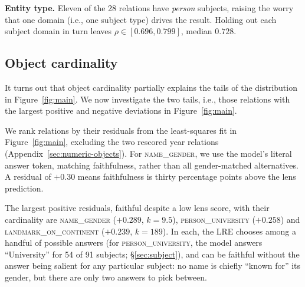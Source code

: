 \documentclass{article}
\begin{document}

\textbf{Entity type.} Eleven of the 28 relations have
\textit{person} subjects, raising the worry that one domain
(i.e., one subject type)
drives the
result. Holding out each subject domain in turn leaves
$\rho \in [0.696, 0.799]$, median $0.728$.

\subsection{Object cardinality}
\label{sec:residuals}
It turns out that object cardinality partially explains the
tails of the distribution 
in Figure~\ref{fig:main}.
We now investigate  the two tails, i.e., those relations
with the largest positive and negative deviations
in Figure~\ref{fig:main}.

We rank relations by their residuals from the least-squares fit in
Figure~\ref{fig:main}, excluding the two rescored year relations
(Appendix~\ref{sec:numeric-objects}). For \textsc{name\_gender}, we use
the model's literal answer token, matching faithfulness, rather than all
gender-matched alternatives. A residual of $+0.30$ means faithfulness
is thirty percentage points above the lens prediction.


The largest positive residuals, faithful despite a low
lens score, with their cardinality are
\textsc{name\_gender} ($+0.289$, $k = 9.5$),
\textsc{person\_university} ($+0.258$) and
\textsc{landmark\_on\_continent} ($+0.239$, $k = 189$). In each, the LRE
chooses among a handful of possible answers (for \textsc{person\_university},
the model answers ``University'' for 54 of 91 subjects; \S\ref{sec:subject}), and can be faithful without
the answer being salient for any particular subject: no name is
chiefly ``known for'' its gender, but there are only two answers to pick
between.
\end{document}
